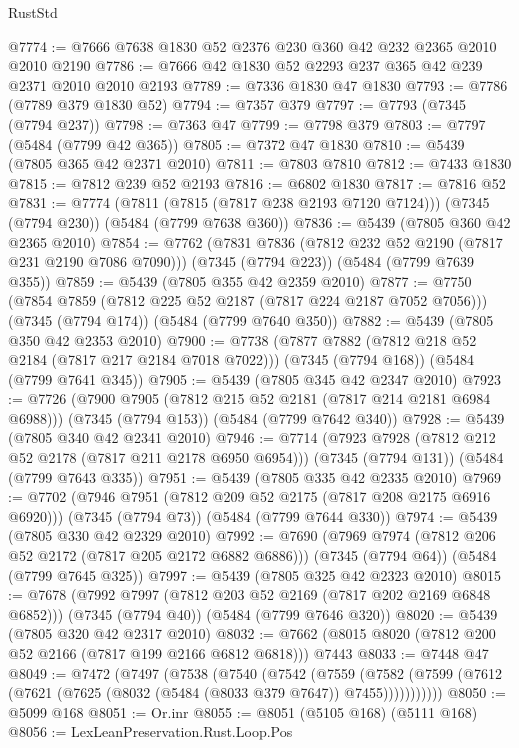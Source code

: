 \begin{lexlean}{RustStd}
\begin{coremodule}
@7774 := @7666 @7638 @1830 @52 @2376 @230 @360 @42 @232 @2365 @2010 @2010 @2190
@7786 := @7666 @42 @1830 @52 @2293 @237 @365 @42 @239 @2371 @2010 @2010 @2193
@7789 := @7336 @1830 @47 @1830
@7793 := @7786 (@7789 @379 @1830 @52)
@7794 := @7357 @379
@7797 := @7793 (@7345 (@7794 @237))
@7798 := @7363 @47
@7799 := @7798 @379
@7803 := @7797 (@5484 (@7799 @42 @365))
@7805 := @7372 @47 @1830
@7810 := @5439 (@7805 @365 @42 @2371 @2010)
@7811 := @7803 @7810
@7812 := @7433 @1830
@7815 := @7812 @239 @52 @2193
@7816 := @6802 @1830
@7817 := @7816 @52
@7831 := @7774
    (@7811 (@7815 (@7817 @238 @2193 @7120 @7124)))
    (@7345 (@7794 @230))
    (@5484 (@7799 @7638 @360))
@7836 := @5439 (@7805 @360 @42 @2365 @2010)
@7854 := @7762
    (@7831 @7836 (@7812 @232 @52 @2190 (@7817 @231 @2190 @7086 @7090)))
    (@7345 (@7794 @223))
    (@5484 (@7799 @7639 @355))
@7859 := @5439 (@7805 @355 @42 @2359 @2010)
@7877 := @7750
    (@7854 @7859 (@7812 @225 @52 @2187 (@7817 @224 @2187 @7052 @7056)))
    (@7345 (@7794 @174))
    (@5484 (@7799 @7640 @350))
@7882 := @5439 (@7805 @350 @42 @2353 @2010)
@7900 := @7738
    (@7877 @7882 (@7812 @218 @52 @2184 (@7817 @217 @2184 @7018 @7022)))
    (@7345 (@7794 @168))
    (@5484 (@7799 @7641 @345))
@7905 := @5439 (@7805 @345 @42 @2347 @2010)
@7923 := @7726
    (@7900 @7905 (@7812 @215 @52 @2181 (@7817 @214 @2181 @6984 @6988)))
    (@7345 (@7794 @153))
    (@5484 (@7799 @7642 @340))
@7928 := @5439 (@7805 @340 @42 @2341 @2010)
@7946 := @7714
    (@7923 @7928 (@7812 @212 @52 @2178 (@7817 @211 @2178 @6950 @6954)))
    (@7345 (@7794 @131))
    (@5484 (@7799 @7643 @335))
@7951 := @5439 (@7805 @335 @42 @2335 @2010)
@7969 := @7702
    (@7946 @7951 (@7812 @209 @52 @2175 (@7817 @208 @2175 @6916 @6920)))
    (@7345 (@7794 @73))
    (@5484 (@7799 @7644 @330))
@7974 := @5439 (@7805 @330 @42 @2329 @2010)
@7992 := @7690
    (@7969 @7974 (@7812 @206 @52 @2172 (@7817 @205 @2172 @6882 @6886)))
    (@7345 (@7794 @64))
    (@5484 (@7799 @7645 @325))
@7997 := @5439 (@7805 @325 @42 @2323 @2010)
@8015 := @7678
    (@7992 @7997 (@7812 @203 @52 @2169 (@7817 @202 @2169 @6848 @6852)))
    (@7345 (@7794 @40))
    (@5484 (@7799 @7646 @320))
@8020 := @5439 (@7805 @320 @42 @2317 @2010)
@8032 := @7662 (@8015 @8020 (@7812 @200 @52 @2166 (@7817 @199 @2166 @6812 @6818))) @7443
@8033 := @7448 @47
@8049 := @7472
    (@7497
      (@7538
        (@7540
          (@7542
            (@7559
              (@7582 (@7599 (@7612 (@7621 (@7625 (@8032 (@5484 (@8033 @379 @7647)) @7455)))))))))))
@8050 := @5099 @168
@8051 := Or.inr
@8055 := @8051 (@5105 @168) (@5111 @168)
@8056 := LexLeanPreservation.Rust.Loop.Pos

\end{coremodule}
\end{lexlean}
